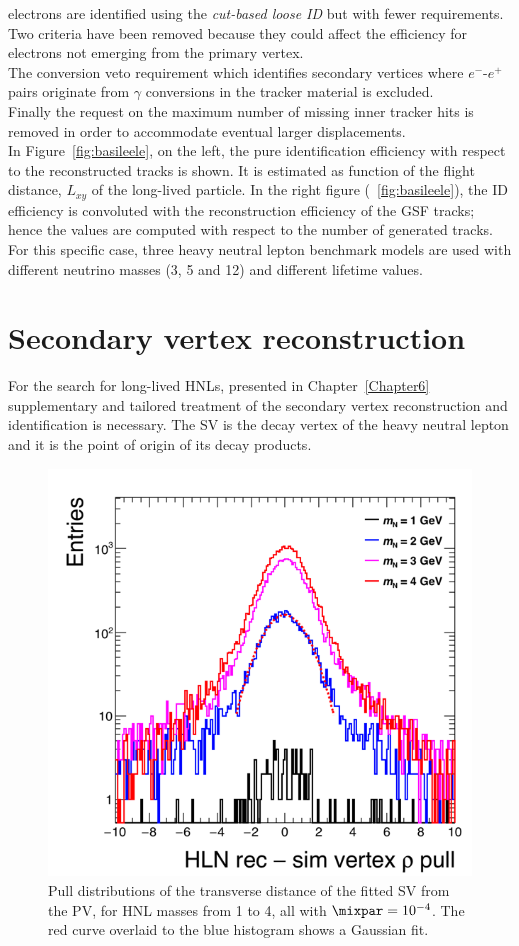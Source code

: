 \Displ electrons are identified using the \emph{cut-based loose ID}
but with fewer requirements. Two criteria have been removed because
they could affect the efficiency for electrons
not emerging from the primary vertex. \\
The conversion veto requirement which identifies
secondary vertices where $e^{-}$-$e^{+}$ pairs 
originate from $\gamma$ conversions in the tracker material is excluded.\\
Finally the request on the maximum number of
missing inner tracker hits is removed in order to accommodate 
eventual larger displacements. \\
In Figure~\ref{fig:basileele}, on the left, the pure
identification efficiency with respect to the
reconstructed tracks is shown. It is estimated as function of the flight
distance, $L_{xy}$ of the long-lived particle. In the right figure
(~\ref{fig:basileele}), the ID efficiency is convoluted with the
reconstruction efficiency of the GSF tracks; hence the values are
computed with respect to the number of
generated tracks. For this specific case, three heavy neutral lepton
benchmark models are used with different neutrino masses (3, 5 and
12\GeV) and different lifetime values.

\clearpage
\section{Secondary vertex reconstruction} \label{sec:c2sv}

For the search for long-lived HNLs, presented in
Chapter~\ref{Chapter6} supplementary and
tailored treatment of the secondary vertex reconstruction and
identification is necessary. The SV is the decay vertex of the heavy
neutral lepton and it is the point of origin of its decay products.
\begin{figure}
\centering
  \includegraphics[clip,trim=0.8cm 0cm .5cm 1.3cm, width=.5\textwidth]{Figures/c2/leptons_fromN_fromNW_vtx_rho_pull.png}
  \caption{Pull distributions of the
    transverse distance of the fitted SV from
    the PV, for HNL masses from 1 to 4\GeV,
    all with $\mixpar=10^{-4}$. The red curve overlaid to the blue
    histogram shows a Gaussian fit. \dani}
  \label{fig:svPulls}
\end{figure} 

